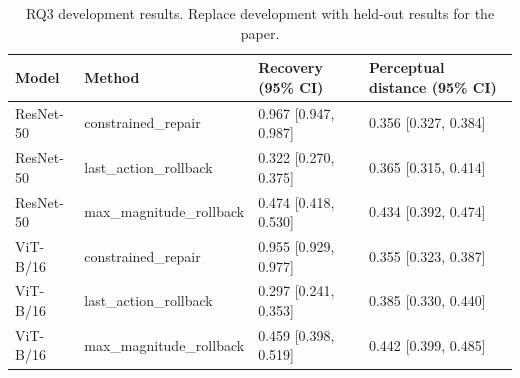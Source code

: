 \begin{table}[t]
\centering
\caption{RQ3 development results. Replace development with held-out results for the paper.}
\label{tab:rq3}
\begin{tabular}{llll}
\toprule
Model & Method & Recovery (95\% CI) & Perceptual distance (95\% CI) \\
\midrule
ResNet-50 & constrained\_repair & 0.967 [0.947, 0.987] & 0.356 [0.327, 0.384] \\
ResNet-50 & last\_action\_rollback & 0.322 [0.270, 0.375] & 0.365 [0.315, 0.414] \\
ResNet-50 & max\_magnitude\_rollback & 0.474 [0.418, 0.530] & 0.434 [0.392, 0.474] \\
ViT-B/16 & constrained\_repair & 0.955 [0.929, 0.977] & 0.355 [0.323, 0.387] \\
ViT-B/16 & last\_action\_rollback & 0.297 [0.241, 0.353] & 0.385 [0.330, 0.440] \\
ViT-B/16 & max\_magnitude\_rollback & 0.459 [0.398, 0.519] & 0.442 [0.399, 0.485] \\
\bottomrule
\end{tabular}
\end{table}
